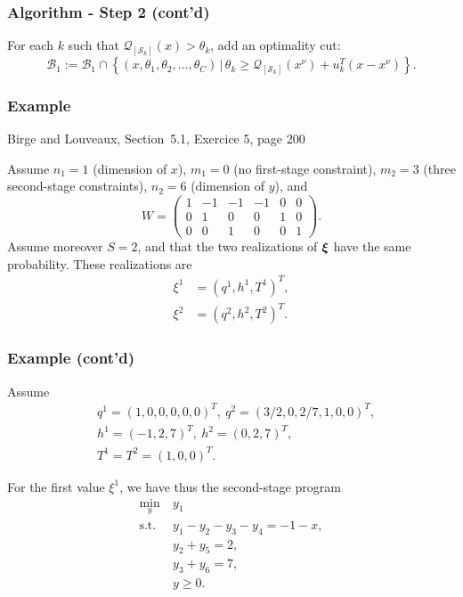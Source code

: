 \documentclass{beamer}
\begin{document}
\begin{frame}
\frametitle{Algorithm - Step 2 (cont'd)}

For each $k$ such that  $\mathcal{Q}_{[\mathcal{S}_k]}(x) >
\theta_k$, add an optimality cut:
\[
\mathcal{B}_1 := \mathcal{B}_1 \cap \left\lbrace (x, \theta_1,
\theta_2,\ldots, \theta_C) \,|\, \theta_k \geq
\mathcal{Q}_{[\mathcal{S}_k]}(x^{\nu}) + u_k^T(x-x^{\nu}) \right\rbrace.
\]



\end{frame}

\begin{frame}
\frametitle{Example}

{\red Birge and Louveaux, Section~5.1, Exercice 5, page 200}

\mbox{}

Assume $n_1 = 1$ (dimension of $x$), $m_1 = 0$ (no first-stage constraint), $m_2 = 3$ (three second-stage constraints), $n_2 = 6$ (dimension of $y$), and
\[
W = \begin{pmatrix}
1 & -1 & -1 & -1 & 0 & 0 \\
0 & 1 & 0 & 0 & 1 & 0 \\
0 & 0 & 1 & 0 & 0 & 1
\end{pmatrix}.
\]
Assume moreover $S = 2$, and that the two realizations of ${\boldsymbol{\xi}}$ have the same probability.
These realizations are
\begin{align*}
\xi^1 &= (q^1, h^1, T^1)^T, \\
\xi^2 &= (q^2, h^2, T^2)^T.
\end{align*}

\end{frame}

\begin{frame}
\frametitle{Example (cont'd)}

Assume
\begin{align*}
& q^1 = (1,0,0,0,0,0)^T,\ q^2 = (3/2, 0, 2/7, 1, 0, 0)^T, \\
& h^1 = (-1,2,7)^T,\ h^2 = (0,2,7)^T, \\
& T^1 = T^2 = (1,0,0)^T.
\end{align*}

\mbox{}

For the first value $\xi^1$, we have thus the second-stage program
\begin{align*}
\min_y\ & y_1 \\
\mbox{s.t. } & y_1 - y_2 - y_3 -y_4 = -1 - x, \\
& y_2 + y_5 = 2, \\
& y_3 + y_6 = 7, \\
& y \geq 0.
\end{align*}

\end{frame}
\end{document}
